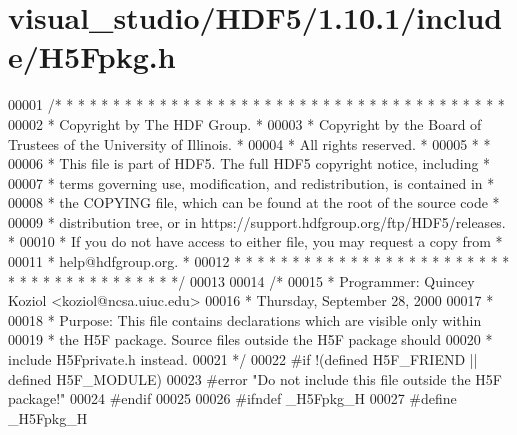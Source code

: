 \hypertarget{visual__studio_2_h_d_f5_21_810_81_2include_2_h5_fpkg_8h_source}{}\section{visual\+\_\+studio/\+H\+D\+F5/1.10.1/include/\+H5\+Fpkg.h}
\label{visual__studio_2_h_d_f5_21_810_81_2include_2_h5_fpkg_8h_source}

\begin{DoxyCode}
00001 \textcolor{comment}{/* * * * * * * * * * * * * * * * * * * * * * * * * * * * * * * * * * * * * * *}
00002 \textcolor{comment}{ * Copyright by The HDF Group.                                               *}
00003 \textcolor{comment}{ * Copyright by the Board of Trustees of the University of Illinois.         *}
00004 \textcolor{comment}{ * All rights reserved.                                                      *}
00005 \textcolor{comment}{ *                                                                           *}
00006 \textcolor{comment}{ * This file is part of HDF5.  The full HDF5 copyright notice, including     *}
00007 \textcolor{comment}{ * terms governing use, modification, and redistribution, is contained in    *}
00008 \textcolor{comment}{ * the COPYING file, which can be found at the root of the source code       *}
00009 \textcolor{comment}{ * distribution tree, or in https://support.hdfgroup.org/ftp/HDF5/releases.  *}
00010 \textcolor{comment}{ * If you do not have access to either file, you may request a copy from     *}
00011 \textcolor{comment}{ * help@hdfgroup.org.                                                        *}
00012 \textcolor{comment}{ * * * * * * * * * * * * * * * * * * * * * * * * * * * * * * * * * * * * * * */}
00013 
00014 \textcolor{comment}{/*}
00015 \textcolor{comment}{ * Programmer:  Quincey Koziol <koziol@ncsa.uiuc.edu>}
00016 \textcolor{comment}{ *      Thursday, September 28, 2000}
00017 \textcolor{comment}{ *}
00018 \textcolor{comment}{ * Purpose: This file contains declarations which are visible only within}
00019 \textcolor{comment}{ *      the H5F package.  Source files outside the H5F package should}
00020 \textcolor{comment}{ *      include H5Fprivate.h instead.}
00021 \textcolor{comment}{ */}
00022 \textcolor{preprocessor}{#if !(defined H5F\_FRIEND || defined H5F\_MODULE)}
00023 \textcolor{preprocessor}{#error "Do not include this file outside the H5F package!"}
00024 \textcolor{preprocessor}{#endif}
00025 
00026 \textcolor{preprocessor}{#ifndef \_H5Fpkg\_H}
00027 \textcolor{preprocessor}{#define \_H5Fpkg\_H}

\end{DoxyCode}
